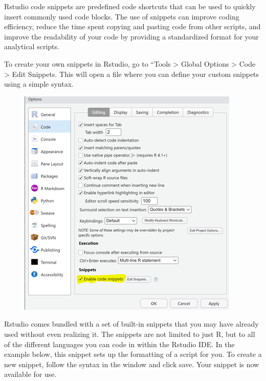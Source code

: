 \documentclass[
  letterpaper,
  DIV=11,
  numbers=noendperiod]{scrreprt}
\begin{document}
Rstudio code snippets are predefined code shortcuts that can be used to
quickly insert commonly used code blocks. The use of snippets can
improve coding efficiency, reduce the time spent copying and pasting
code from other scripts, and improve the readability of your code by
providing a standardized format for your analytical scripts.

To create your own snippets in Rstudio, go to ``Tools \textgreater{}
Global Options \textgreater{} Code \textgreater{} Edit Snippets. This
will open a file where you can define your custom snippets using a
simple syntax.

\begin{figure}

{\centering \includegraphics{./images/r_setup-snippets_global-options.png}

}

\end{figure}

Rstudio comes bundled with a set of built-in snippets that you may have
already used without even realizing it. The snippets are not limited to
just R, but to all of the different languages you can code in within the
Rstudio IDE. In the example below, this snippet sets up the formatting
of a script for you. To create a new snippet, follow the syntax in the
window and click save. Your snippet is now available for use.
\end{document}
